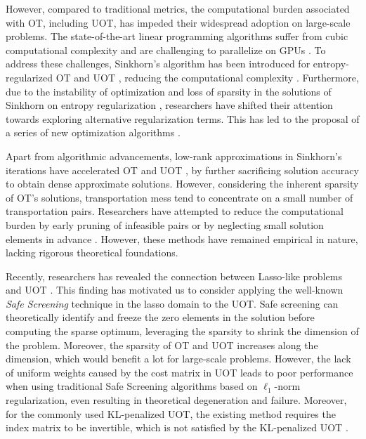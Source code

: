 \documentclass[11pt]{article}
\begin{document}
However, compared to traditional metrics, the computational burden associated with OT, including UOT, has impeded their widespread adoption on large-scale problems. The state-of-the-art linear programming algorithms suffer from cubic computational complexity and are challenging to parallelize on GPUs \cite{DBLP:journals/orl/Volgenant05}. To address these challenges, Sinkhorn's algorithm \cite{Sinkhorn_1974} has been introduced for entropy-regularized OT and UOT \cite{Cuturi_NIPS_2013,DBLP:journals/moc/ChizatPSV18}, reducing the computational complexity \cite{DBLP:conf/nips/AltschulerWR17, DBLP:conf/icml/PhamLHPB20} . Furthermore, due to the instability of optimization and loss of sparsity in the solutions of Sinkhorn on entropy regularization \cite{DBLP:journals/corr/Schmitzer16, Blondel_AISTATS_2018}, researchers have shifted their attention towards exploring alternative regularization terms. This has led to the proposal of a series of new optimization algorithms \cite{DBLP:conf/nips/GenevayCPB16, DBLP:conf/icml/GuminovDTG21, Nguyen_arXiv_2022}.

Apart from algorithmic advancements, low-rank approximations in Sinkhorn's iterations have accelerated OT and UOT \cite{DBLP:conf/icml/ScetbonCP21, DBLP:conf/nips/AltschulerBRN19}, by further sacrificing solution accuracy to obtain dense approximate solutions. However, considering the inherent sparsity of OT's solutions, transportation mess tend to concentrate on a small number of transportation pairs. Researchers have attempted to reduce the computational burden by early pruning of infeasible pairs or by neglecting small solution elements in advance \cite{doi:10.1137/16M1106018, DBLP:conf/icml/KlicperaLG21} . However, these methods have remained empirical in nature, lacking rigorous theoretical foundations. 

Recently, researchers has revealed the connection between Lasso-like problems \cite{Tibshirani_JRSS_1996,Efron_AM_2004} and UOT \cite{Chapel_NeurIPS_2021}. This finding has motivated us to consider applying the well-known {\it Safe Screening} technique \cite{ghaoui2010safe} in the lasso domain to the UOT. Safe screening can theoretically identify and freeze the zero elements in the solution before computing the sparse optimum, leveraging the sparsity to shrink the dimension of the problem. Moreover, the sparsity of OT and UOT increases along the dimension, which would benefit a lot for large-scale problems. However, the lack of uniform weights caused by the cost matrix in UOT leads to poor performance when using traditional Safe Screening algorithms based on $\ell_1$-norm regularization, even resulting in theoretical degeneration and failure. Moreover, for the commonly used KL-penalized UOT, the existing method requires the index matrix to be invertible, which is not satisfied by the KL-penalized UOT \cite{9414183}.
\end{document}
